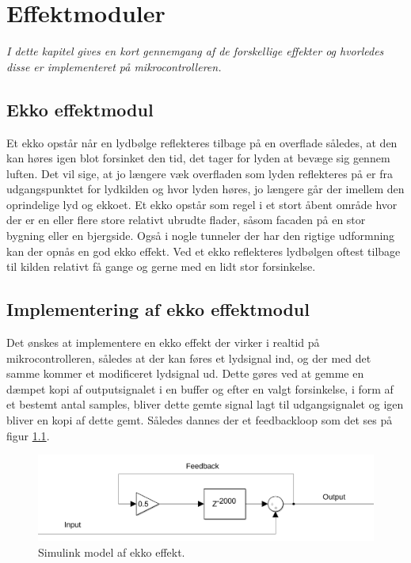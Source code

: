 \chapter{Effektmoduler}\label{chap:DSP}
\emph{I dette kapitel gives en kort gennemgang af de forskellige effekter og hvorledes disse er implementeret på mikrocontrolleren.}


\section{Ekko effektmodul}\label{sec:echo}
Et ekko opstår når en lydbølge reflekteres tilbage på en overflade således, at den kan høres igen blot forsinket den tid, det tager for lyden at bevæge sig gennem luften.
Det vil sige, at jo længere væk overfladen som lyden reflekteres på er fra udgangspunktet for lydkilden og hvor lyden høres, jo længere går der imellem den oprindelige lyd og ekkoet.
Et ekko opstår som regel i et stort åbent område hvor der er en eller flere store relativt ubrudte flader, såsom facaden på en stor bygning eller en bjergside.
Også i nogle tunneler der har den rigtige udformning kan der opnås en god ekko effekt.
Ved et ekko reflekteres lydbølgen oftest tilbage til kilden relativt få gange og gerne med en lidt stor forsinkelse.

\section{Implementering af ekko effektmodul}
Det ønskes at implementere en ekko effekt der virker i realtid på mikrocontrolleren, således at der kan føres et lydsignal ind, og der med det samme kommer et modificeret lydsignal ud.
Dette gøres ved at gemme en dæmpet kopi af outputsignalet i en buffer og efter en valgt forsinkelse, i form af et bestemt antal samples, bliver dette gemte signal lagt til udgangsignalet og igen bliver en kopi af dette gemt. Således dannes der et feedbackloop som det ses på figur \ref{fig:echo_simulink}.

\begin{figure}[h]
	\includegraphics[width=0.8\linewidth]{./billeder/Echo_simulink.png}
	\caption{Simulink model af ekko effekt.}
	\label{fig:echo_simulink}
\end{figure}


